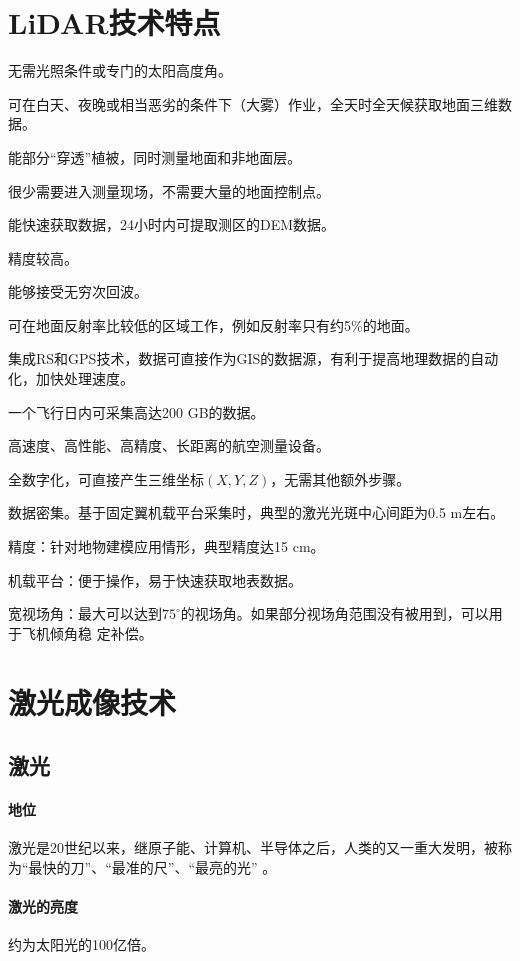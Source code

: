 \section{LiDAR技术特点}
\begin{enumerate*}
	\item 无需光照条件或专门的太阳高度角。
	\item 可在白天、夜晚或相当恶劣的条件下（大雾）作业，全天时全天候获取地面三维数据。
	\item 能部分“穿透”植被，同时测量地面和非地面层。
	\item 很少需要进入测量现场，不需要大量的地面控制点。
	\item 能快速获取数据，24小时内可提取测区的DEM数据。
	\item 精度较高。
	\item 能够接受无穷次回波。
	\item 可在地面反射率比较低的区域工作，例如反射率只有约5\%的地面。
	\item 集成RS和GPS技术，数据可直接作为GIS的数据源，有利于提高地理数据的自动化，加快处理速度。
	\item 一个飞行日内可采集高达200 GB的数据。
	\item 高速度、高性能、高精度、长距离的航空测量设备。
	\item 全数字化，可直接产生三维坐标$ (X,Y,Z) $，无需其他额外步骤。
	\item 数据密集。基于固定翼机载平台采集时，典型的激光光斑中心间距为0.5 m左右。
	\item 精度：针对地物建模应用情形，典型精度达15 cm。
	\item 机载平台：便于操作，易于快速获取地表数据。
	\item 宽视场角：最大可以达到$ 75^{\circ} $的视场角。如果部分视场角范围没有被用到，可以用于飞机倾角稳
	定补偿。
\end{enumerate*}

\section{激光成像技术}
\subsection{激光}
\paragraph{地位}激光是20世纪以来，继原子能、计算机、半导体之后，人类的又一重大发明，被称为“最快的刀”、“最准的尺”、“最亮的光” 。
\paragraph{激光的亮度}约为太阳光的100亿倍。
